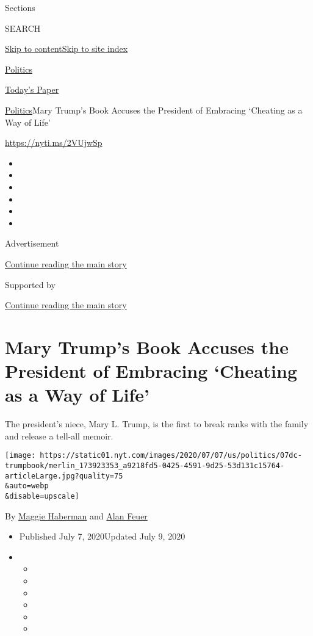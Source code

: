 Sections

SEARCH

\protect\hyperlink{site-content}{Skip to
content}\protect\hyperlink{site-index}{Skip to site index}

\href{https://www.nytimes.com/section/politics}{Politics}

\href{https://myaccount.nytimes.com/auth/login?response_type=cookie\&client_id=vi}{}

\href{https://www.nytimes.com/section/todayspaper}{Today's Paper}

\href{/section/politics}{Politics}\textbar{}Mary Trump's Book Accuses
the President of Embracing `Cheating as a Way of Life'

\url{https://nyti.ms/2VUjwSp}

\begin{itemize}
\item
\item
\item
\item
\item
\item
\end{itemize}

Advertisement

\protect\hyperlink{after-top}{Continue reading the main story}

Supported by

\protect\hyperlink{after-sponsor}{Continue reading the main story}

\hypertarget{mary-trumps-book-accuses-the-president-of-embracing-cheating-as-a-way-of-life}{%
\section{Mary Trump's Book Accuses the President of Embracing `Cheating
as a Way of
Life'}\label{mary-trumps-book-accuses-the-president-of-embracing-cheating-as-a-way-of-life}}

The president's niece, Mary L. Trump, is the first to break ranks with
the family and release a tell-all memoir.

\texttt{[image: https://static01.nyt.com/images/2020/07/07/us/politics/07dc-trumpbook/merlin\_173923353\_a9218fd5-0425-4591-9d25-53d131c15764-articleLarge.jpg?quality=75\\\&auto=webp\\\&disable=upscale]}

By \href{https://www.nytimes.com/by/maggie-haberman}{Maggie Haberman}
and \href{https://www.nytimes.com/by/alan-feuer}{Alan Feuer}

\begin{itemize}
\item
  Published July 7, 2020Updated July 9, 2020
\item
  \begin{itemize}
  \item
  \item
  \item
  \item
  \item
  \item
  \end{itemize}
\end{itemize}


